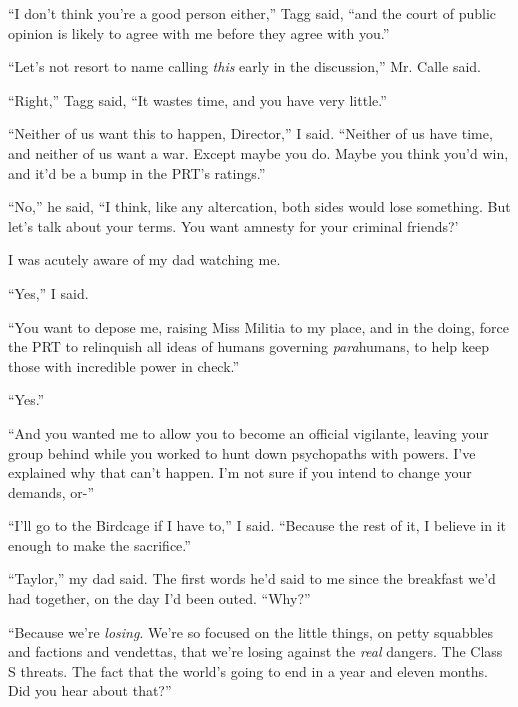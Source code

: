 ``I don't think you're a good person either,'' Tagg said, ``and the court of public opinion is likely to agree with me before they agree with you.''



``Let's not resort to name calling \emph{this} early in the discussion,'' Mr. Calle said.



``Right,'' Tagg said, ``It wastes time, and you have very little.''



``Neither of us want this to happen, Director,'' I said.  ``Neither of us have time, and neither of us want a war.  Except maybe you do.  Maybe you think you'd win, and it'd be a bump in the PRT's ratings.''



``No,'' he said, ``I think, like any altercation, both sides would lose something.  But let's talk about your terms.  You want amnesty for your criminal friends?'



I was acutely aware of my dad watching me.



``Yes,'' I said.



``You want to depose me, raising Miss Militia to my place, and in the doing, force the PRT to relinquish all ideas of humans governing \emph{para}humans, to help keep those with incredible power in check.''



``Yes.''



``And you wanted me to allow you to become an official vigilante, leaving your group behind while you worked to hunt down psychopaths with powers.  I've explained why that can't happen.  I'm not sure if you intend to change your demands, or-''



``I'll go to the Birdcage if I have to,'' I said.  ``Because the rest of it, I believe in it enough to make the sacrifice.''



``Taylor,'' my dad said.  The first words he'd said to me since the breakfast we'd had together, on the day I'd been outed.  ``Why?''



``Because we're \emph{losing}.  We're so focused on the little things, on petty squabbles and factions and vendettas, that we're losing against the \emph{real} dangers.  The Class S threats.  The fact that the world's going to end in a year and eleven months.  Did you hear about that?''



